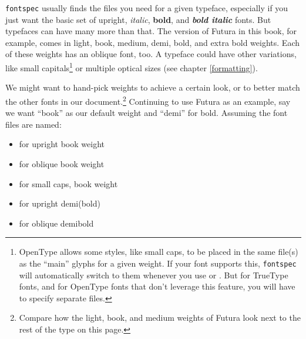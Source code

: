 \texttt{fontspec} usually finds the files you need for a given typeface,
especially if you just want the basic set of
upright,
\textit{italic},
\textbf{bold}, and
\textit{\textbf{bold italic}} fonts.
But typefaces can have many more than that.
The version of Futura in this book, for example, comes in
{light},
{book},
{medium},
{demi},
{bold}, and
{extra bold} weights.
Each of these weights has an oblique font, too.
A typeface could have other variations,
like {small capitals}\footnote{%
OpenType allows some styles, like small caps, to be placed in the same file(s)
as the ``main'' glyphs for a given weight.
If your font supports this, \texttt{fontspec}
will automatically switch to them whenever you use
 or .
But for TrueType fonts,
and for OpenType fonts that don't leverage this feature,
you will have to specify separate files.}
or multiple optical sizes (see chapter \ref{formatting}).

We might want to hand-pick weights to achieve a certain look,
or to better match the
other fonts in our document.\punckern\footnote{Compare how
{the light,}
{book,}
{and medium weights}
of Futura look next to the rest of the type on this page.}
Continuing to use Futura as an example,
say we want ``book'' as our default weight
and ``demi'' for bold.
Assuming the font files are named:
\begin{itemize}
\item {} for
    {upright book weight}
\item {} for
    {oblique book weight}
\item {} for
    {small caps, book weight}
\item {} for
    {upright demi(bold)}
\item {} for
    {oblique demibold}
\end{itemize}

